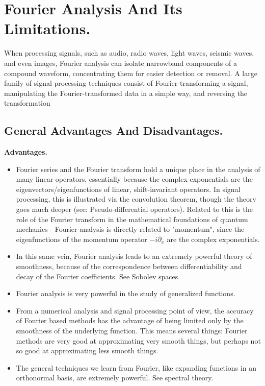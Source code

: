 \section{Fourier Analysis And Its Limitations.}
\label{sec1}

\par

When processing signals, such as audio, radio waves, light waves, seismic waves, and even images, Fourier analysis can isolate narrowband components of a compound waveform, concentrating them for easier detection or removal. A large family of signal processing techniques consist of Fourier-transforming a signal, manipulating the Fourier-transformed data in a simple way, and reversing the transformation

\subsection*{General Advantages And Disadvantages.}

\textbf{Advantages.}

\begin{itemize}
   \item Fourier series and the Fourier transform hold a unique place in the analysis of many linear operators, essentially because the complex exponentials are the eigenvectors/eigenfunctions of linear, shift-invariant operators. In signal processing, this is illustrated via the convolution theorem, though the theory goes much deeper (see: Pseudo-differential operators). Related to this is the role of the Fourier transform in the mathematical foundations of quantum mechanics - Fourier analysis is directly related to "momentum", since the eigenfunctions of the momentum operator $ −i\partial_{x}$ are the complex exponentials.
   
   \item In this same vein, Fourier analysis leads to an extremely powerful theory of smoothness, because of the correspondence between differentiability and decay of the Fourier coefficients. See Sobolev spaces.
   
   \item Fourier analysis is very powerful in the study of generalized functions.
   
   \item From a numerical analysis and signal processing point of view, the accuracy of Fourier based methods has the advantage of being limited only by the smoothness of the underlying function. This means several things: Fourier methods are very good at approximating very smooth things, but perhaps not so good at approximating less smooth things.
   
   \item The general techniques we learn from Fourier, like expanding functions in an orthonormal basis, are extremely powerful. See spectral theory.

\end{itemize}

